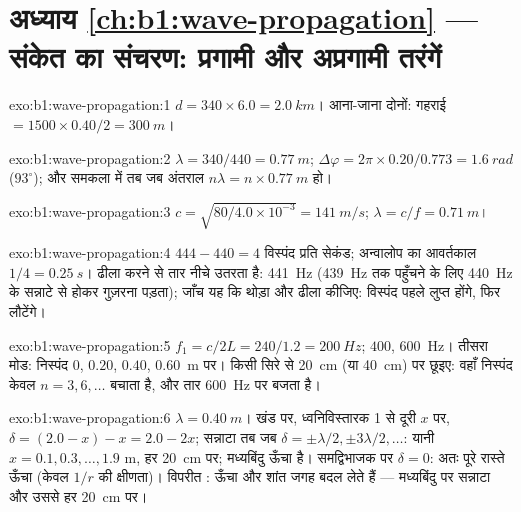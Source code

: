 \section*{अध्याय \ref{ch:b1:wave-propagation} --- संकेत का संचरण: प्रगामी और अप्रगामी तरंगें}

\begin{solution}{exo:b1:wave-propagation:1}
$d = 340 \times 6.0 = \qty{2.0}{km}$। आना-जाना दोनों: गहराई $= 1500 \times
0.40/2 = \qty{300}{m}$।
\end{solution}

\begin{solution}{exo:b1:wave-propagation:2}
$\lambda = 340/440 = \qty{0.77}{m}$; $\Delta\varphi = 2\pi \times
0.20/0.773 = \qty{1.6}{rad}$ ($93^\circ$); और समकला में तब जब अंतराल
$n\lambda = n \times \qty{0.77}{m}$ हो।
\end{solution}

\begin{solution}{exo:b1:wave-propagation:3}
$c = \sqrt{80/4.0\times10^{-3}} = \qty{141}{m/s}$; $\lambda = c/f =
\qty{0.71}{m}$।
\end{solution}

\begin{solution}{exo:b1:wave-propagation:4}
$444 - 440 = 4$ विस्पंद प्रति सेकंड; अन्वालोप का आवर्तकाल $1/4 = \qty{0.25}{s}$।
ढीला करने से तार नीचे उतरता है: \qty{441}{Hz} (\qty{439}{Hz} तक पहुँचने के
लिए \qty{440}{Hz} के सन्नाटे से होकर गुज़रना पड़ता); जाँच यह कि थोड़ा और ढीला
कीजिए: विस्पंद पहले लुप्त होंगे, फिर लौटेंगे।
\end{solution}

\begin{solution}{exo:b1:wave-propagation:5}
$f_1 = c/2L = 240/1.2 = \qty{200}{Hz}$; $400$, \qty{600}{Hz}। तीसरा मोड:
निस्पंद $0$, $0.20$, $0.40$, \qty{0.60}{m} पर। किसी सिरे से \qty{20}{cm}
(या \qty{40}{cm}) पर छूइए: वहाँ निस्पंद केवल $n = 3, 6, \dots$ बचाता है, और
तार \qty{600}{Hz} पर बजता है।
\end{solution}

\begin{solution}{exo:b1:wave-propagation:6}
$\lambda = \qty{0.40}{m}$। खंड पर, ध्वनिविस्तारक 1 से दूरी $x$ पर,
$\delta = (2.0 - x) - x = 2.0 - 2x$; सन्नाटा तब जब $\delta = \pm\lambda/2,
\pm 3\lambda/2, \dots$: यानी $x = 0.1, 0.3, \dots, 1.9$ m, हर \qty{20}{cm} पर;
मध्यबिंदु ऊँचा है। समद्विभाजक पर $\delta = 0$: अतः पूरे रास्ते ऊँचा (केवल
$1/r$ की क्षीणता)। विपरीत : ऊँचा और शांत जगह बदल लेते हैं --- मध्यबिंदु पर
सन्नाटा और उससे हर \qty{20}{cm} पर।
\end{solution}

